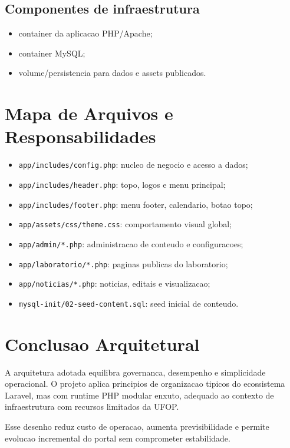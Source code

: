 \documentclass[12pt,a4paper]{article}
\begin{document}
\subsection{Componentes de infraestrutura}
\begin{itemize}
\item container da aplicacao PHP/Apache;
\item container MySQL;
\item volume/persistencia para dados e assets publicados.
\end{itemize}

\section{Mapa de Arquivos e Responsabilidades}
\begin{itemize}
\item \texttt{app/includes/config.php}: nucleo de negocio e acesso a dados;
\item \texttt{app/includes/header.php}: topo, logos e menu principal;
\item \texttt{app/includes/footer.php}: menu footer, calendario, botao topo;
\item \texttt{app/assets/css/theme.css}: comportamento visual global;
\item \texttt{app/admin/*.php}: administracao de conteudo e configuracoes;
\item \texttt{app/laboratorio/*.php}: paginas publicas do laboratorio;
\item \texttt{app/noticias/*.php}: noticias, editais e visualizacao;
\item \texttt{mysql-init/02-seed-content.sql}: seed inicial de conteudo.
\end{itemize}

\section{Conclusao Arquitetural}
A arquitetura adotada equilibra governanca, desempenho e simplicidade operacional. O projeto aplica principios de organizacao tipicos do ecossistema Laravel, mas com runtime PHP modular enxuto, adequado ao contexto de infraestrutura com recursos limitados da UFOP.

Esse desenho reduz custo de operacao, aumenta previsibilidade e permite evolucao incremental do portal sem comprometer estabilidade.
\end{document}
